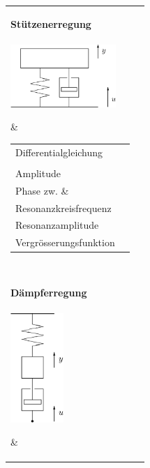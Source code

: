 \renewcommand{\arraystretch}{1.3}
\begin{tabular}{|l|l|}
\hline
\parbox{6cm}{
	\textbf{Stützenerregung}\\ \\
	\includegraphics[width=4cm]{./bilder/stuetzenerregung.png}}
	& \begin{minipage}[]{12cm}
      \renewcommand{\arraystretch}{2}
		\begin{tabular}{ll}
    	Differentialgleichung
    		& $m\,\ddot{y}+b\,\dot{y}+c\,y=$
    		\textcolor{blue}{$c\,u_0\,\sin(\omega t) + b\,\omega\,u_0\,\cos(\omega t)$}
    		\\ & $m\, \ddot{q} + b\,\dot{q} + c\,q =$
    		\textcolor{blue}{$m\,\omega^2\,u_0\,\sin(\omega t)$} \\
    	Amplitude
    		&
    		$A=\dfrac{\omega^2\,u_0}{\sqrt{(\omega_0^2-\omega^2)^2+(2D\,\omega_0\,\omega)^2}}$ \\
    	Phase zw. $\omega_0$ \& $\omega$
    		&
    		$\varphi=\arctan\left(\dfrac{2D\,\omega_0\,\omega}{\omega_0^2-\omega^2}\right)-\pi$\\ 
    	Resonanzkreisfrequenz
    		& $\omega_r=\dfrac{\omega_0}{\sqrt{1-2D^2}}$\\
    	Resonanzamplitude
    		& $A_r=\dfrac{u_0}{2D\sqrt{1-D^2}}$\\
    	Vergrösserungsfunktion
    		& $V=\dfrac{\eta^2}{\sqrt{(1-\eta^2)^2+(2D\eta)^2}}$ 
		\end{tabular}
    \end{minipage} \\
\hline
\parbox{6cm}{
	\textbf{Dämpferregung}\\ \\
	\includegraphics[width=2cm]{./bilder/daempferregung.png}}
	& \begin{minipage}[]{12cm}
      \renewcommand{\arraystretch}{2}

\end{minipage}
\end{tabular}
